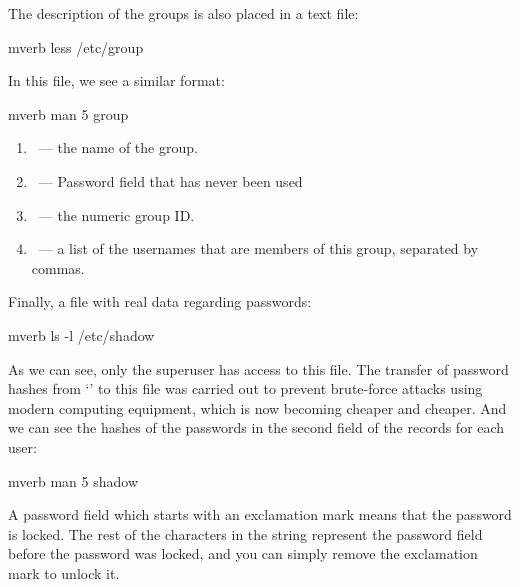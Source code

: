 The description of the groups is also placed in a text file:
\begin{code}{mverb}
less /etc/group
\end{code}
In this file, we see a similar format:
\begin{code}{mverb}
man 5 group
\end{code}
\begin{enumerate}
\item {}~--- the name of the group.
\item {}~--- Password field that has never been used
\item {}~--- the numeric group ID.
\item {}~--- a list of the usernames that are members of
      this group, separated by commas.
\end{enumerate}

Finally, a file with real data regarding passwords:
\begin{code}{mverb}
ls -l /etc/shadow
\end{code}
As we can see, only the superuser has access to this file. The transfer of
password hashes from `' to this file was carried out to
prevent brute-force attacks using modern computing equipment, which is now
becoming cheaper and cheaper. And we can see the hashes of the passwords in
the second field of the records for each user:
\begin{code}{mverb}
man 5 shadow
\end{code}
A password field which starts with an exclamation mark means that the password
is locked. The rest of the characters in the string represent the password field
before the password was locked, and you can simply remove the exclamation mark
to unlock it.


